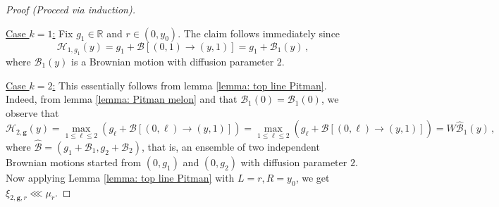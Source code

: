 \documentclass[12pt]{report}
\theoremstyle{plain}
\newcommand{\R}{\ensuremath{\mathbb{R}}}
\begin{document}
\begin{proof}[Proof (Proceed via induction)]
$ $\newline

\noindent\underline{Case $k=1$:} Fix $g_1\in\R$ and $r\in(0,y_0)$. The claim follows immediately since 
\[
\mathcal{H}_{1,g_1}(y) = g_1+\mathbf{\mathcal{B}}[(0,1)\to(y,1)] = g_1+\mathcal{B}_1(y)\,,
\]
where $\mathcal{B}_1(y)$ is a Brownian motion with diffusion parameter $2$. 

\noindent\underline{Case $k=2$:} This essentially follows from lemma \ref{lemma: top line Pitman}. Indeed, from lemma \ref{lemma: Pitman melon} and that $\mathcal{B}_1(0) = \mathcal{B}_1(0)$, we observe that
\[
\mathcal{H}_{2,\mathbf{g}}(y) = \displaystyle\max_{1\leq \ell\leq 2}(g_\ell+\mathbf{\mathcal{B}}[(0,\ell)\to(y,1)]) = \displaystyle\max_{1\leq \ell\leq 2}(g_\ell+\mathbf{\hat{\mathcal{B}}}[(0,\ell)\to(y,1)])= W\hat{\mathcal{B}}_1(y)\,,
\]
where $\hat{\mathcal{B}} = (g_1+\mathcal{B}_1, g_2+\mathcal{B}_2)$, that is, an ensemble of two independent Brownian motions started from $(0,g_1)$ and $(0,g_2)$ with diffusion parameter $2$. Now applying Lemma \ref{lemma: top line Pitman} with $L = r, R = y_0$, we get $\xi_{2,\mathbf{g},r}\lll\mu_r$.


\end{proof}
\end{document}
